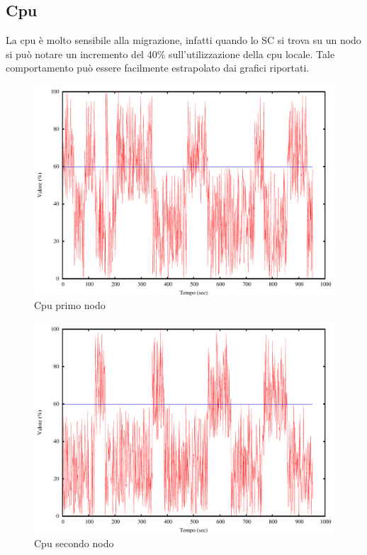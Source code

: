\subsection{Cpu}
La cpu è molto sensibile alla migrazione, infatti quando lo SC si trova su un nodo si può notare un incremento del 40\% sull'utilizzazione della cpu locale. Tale comportamento può essere facilmente estrapolato dai grafici riportati.
\begin{figure}[H]
\begin{center}
\includegraphics[scale=0.6]{etc/cpu1.pdf}
\caption{Cpu primo nodo}
\label{fig:cpu1}
\end{center}
\end{figure}
\begin{figure}[H]
\begin{center}
\includegraphics[scale=0.6]{etc/cpu2.pdf}
\caption{Cpu secondo nodo}
\label{fig:cpu2}
\end{center}
\end{figure}
